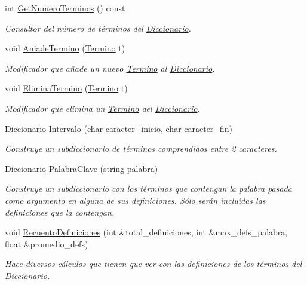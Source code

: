 \begin{DoxyCompactItemize}
int \mbox{\hyperlink{classDiccionario_a52ee9ad6a4b58befe9c3603e405cb360}{Get\+Numero\+Terminos}} () const
\begin{DoxyCompactList}\small\item\em Consultor del número de términos del \mbox{\hyperlink{classDiccionario}{Diccionario}}. \end{DoxyCompactList}\item 
void \mbox{\hyperlink{classDiccionario_ac5b159cfde287d6964be059380a94a88}{Aniade\+Termino}} (\mbox{\hyperlink{classTermino}{Termino}} t)
\begin{DoxyCompactList}\small\item\em Modificador que añade un nuevo \mbox{\hyperlink{classTermino}{Termino}} al \mbox{\hyperlink{classDiccionario}{Diccionario}}. \end{DoxyCompactList}\item 
void \mbox{\hyperlink{classDiccionario_a30f3ba501df6db597f87ca6bd37f069e}{Elimina\+Termino}} (\mbox{\hyperlink{classTermino}{Termino}} t)
\begin{DoxyCompactList}\small\item\em Modificador que elimina un \mbox{\hyperlink{classTermino}{Termino}} del \mbox{\hyperlink{classDiccionario}{Diccionario}}. \end{DoxyCompactList}\item 
\mbox{\hyperlink{classDiccionario}{Diccionario}} \mbox{\hyperlink{classDiccionario_a29730154b15bac2457f116b354635fae}{Intervalo}} (char caracter\+\_\+inicio, char caracter\+\_\+fin)
\begin{DoxyCompactList}\small\item\em Construye un subdiccionario de términos comprendidos entre 2 caracteres. \end{DoxyCompactList}\item 
\mbox{\hyperlink{classDiccionario}{Diccionario}} \mbox{\hyperlink{classDiccionario_a93ebea1ecbe24d1f54a3e75223f90fbf}{Palabra\+Clave}} (string palabra)
\begin{DoxyCompactList}\small\item\em Construye un subdiccionario con los términos que contengan la palabra pasada como argumento en alguna de sus definiciones. Sólo serán incluidas las definiciones que la contengan. \end{DoxyCompactList}\item 
void \mbox{\hyperlink{classDiccionario_abbd34340d309f6217e52d647b3d40b1c}{Recuento\+Definiciones}} (int \&total\+\_\+definiciones, int \&max\+\_\+defs\+\_\+palabra, float \&promedio\+\_\+defs)
\begin{DoxyCompactList}\small\item\em Hace diversos cálculos que tienen que ver con las definiciones de los términos del \mbox{\hyperlink{classDiccionario}{Diccionario}}. \end{DoxyCompactList}\end{DoxyCompactItemize}
